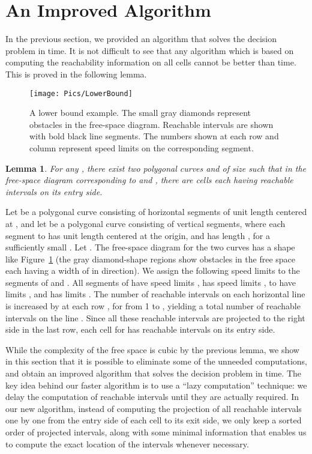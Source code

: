 \documentclass[12pt]{dalthesis}
\def\favoritefont{\bfseries \sffamily}
\def\QED{\ensuremath{{\Box}}}
\def\markatright#1{\leavevmode\unskip\nobreak\quad\hspace*{\fill}{#1}}
\newenvironment{proof}
	{\begin{trivlist}\item[\hskip\labelsep{\favoritefont Proof:}]}
	{\markatright{\QED}\end{trivlist}}
\newtheorem{lemma}[theorem]{Lemma}
\begin{document}
\section{An Improved Algorithm} \label{sec:improvedSpeed}

In the previous section,
we provided an algorithm that solves the decision problem in  time.
It is not difficult to see that any algorithm which is based on computing the reachability information on
all cells cannot be better than  time.
This is proved in the following lemma.


\begin{figure}[t]
	\centering
	\texttt{[image: Pics/LowerBound]}  
	\caption{ A lower bound example.
	The small gray diamonds represent obstacles in the free-space diagram.
	Reachable intervals are shown with bold black line segments.
	The numbers shown at each row and column represent speed limits on the corresponding segment.} 
	\label{fig:lowerbd}
\end{figure}

\begin{lemma} \label{lem:lowerbd}
	For any , there exist two polygonal curves  and  of size  such that in the  free-space diagram corresponding to  and , 
	there are  cells each having  reachable intervals on its entry side.
\end{lemma}

\begin{proof}
	Let  be a polygonal curve consisting of  horizontal segments of unit length
	centered at ,
	and let  be a polygonal curve consisting of  vertical segments, 
	where each segment  to  has unit length centered at the origin,
	and  has length , for a sufficiently small .
	Let .
	The free-space diagram  for the two curves has a shape like 
	Figure~\ref{fig:lowerbd} (the gray diamond-shape regions show obstacles in the free space
	each having a width of  in  direction).
	We assign the following speed limits to the segments of  and .
	All segments of  have speed limits , 
	 has speed limits ,  to  have limits , and
	 has limits .
The number of reachable intervals on each horizontal line  is increased by  
	at each row , for  from 1 to , 
	yielding a total number of  reachable intervals on the line .
	Since all these reachable intervals are projected to the right side in the last row, 
	each cell  for  has  
	reachable intervals on its entry side.
\end{proof}

While the complexity of the free space is cubic by the previous lemma,
we show in this section that it is possible to
eliminate some of the unneeded computations, and
obtain an improved algorithm that solves the decision problem in  time.
The key idea behind our faster algorithm is to use a ``lazy computation'' technique: 
we delay the computation of reachable intervals until they are actually required.
In our new algorithm, instead of computing the projection of all reachable intervals 
one by one from the entry side of each cell to its exit side, 
we only keep a sorted order of projected intervals,
along with some minimal information
that enables us to compute the exact location of the intervals whenever necessary.
\end{document}

